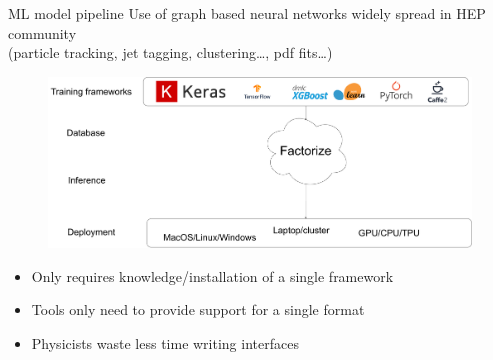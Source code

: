 \documentclass[aspectratio=169,9pt]{beamer}
\begin{document}
\begin{frame}[t]{ML model pipeline}
  Use of graph based neural networks widely spread in HEP community \\
  (particle tracking, jet tagging, clustering\ldots, pdf fits\ldots)\\\vspace*{0.5cm}
  \begin{figure}
    \centering
    \includegraphics[width=.6\textwidth]{factorize_this_workflow.pdf}
  \end{figure}
  \begin{itemize}
    \item Only requires knowledge/installation of a single framework
    \item Tools only need to provide support for a single format
    \item Physicists waste less time writing interfaces
  \end{itemize}
\end{frame}


\end{document}
